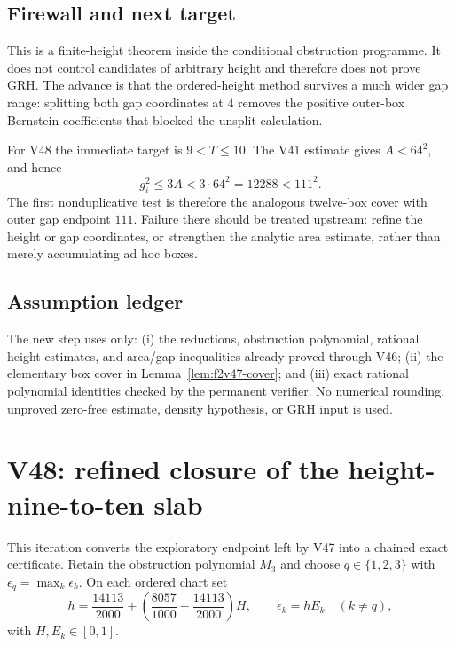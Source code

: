 \documentclass[11pt]{article}
\theoremstyle{definition}
\theoremstyle{remark}
\begin{document}
\subsection*{Firewall and next target}
\label{fire:f2v47}
This is a finite-height theorem inside the conditional obstruction programme.  It
does not control candidates of arbitrary height and therefore does not prove GRH.
The advance is that the ordered-height method survives a much wider gap range:
splitting both gap coordinates at \(4\) removes the positive outer-box Bernstein
coefficients that blocked the unsplit calculation.

For V48 the immediate target is \(9<T\leq10\).  The V41 estimate gives
\(A<64^2\), and hence
\begin{equation}
  g_i^2\leq3A<3\cdot64^2=12288<111^2.
  \label{eq:f2v47-next-gap}
\end{equation}
The first nonduplicative test is therefore the analogous twelve-box cover with
outer gap endpoint \(111\).  Failure there should be treated upstream: refine the
height or gap coordinates, or strengthen the analytic area estimate, rather than
merely accumulating ad hoc boxes.

\subsection*{Assumption ledger}
\label{ass:f2v47}
The new step uses only: (i) the reductions, obstruction polynomial, rational
height estimates, and area/gap inequalities already proved through V46;
(ii) the elementary box cover in Lemma~\ref{lem:f2v47-cover}; and (iii) exact
rational polynomial identities checked by the permanent verifier.  No numerical
rounding, unproved zero-free estimate, density hypothesis, or GRH input is used.


\endgroup


\clearpage
\section{V48: refined closure of the height-nine-to-ten slab}
\label{sec:f2v48-nine-ten}
\begingroup
\setcounter{equation}{0}
\renewcommand{\theequation}{N48.\arabic{equation}}
\renewcommand{\theHequation}{f2v48.\arabic{equation}}

This iteration converts the exploratory endpoint left by V47 into a chained exact
certificate.  Retain the obstruction polynomial \(M_3\) and choose
\(q\in\{1,2,3\}\) with \(\epsilon_q=\max_k\epsilon_k\).  On each ordered chart set
\begin{equation}
 h=\frac{14113}{2000}
   +\left(\frac{8057}{1000}-\frac{14113}{2000}\right)H,
 \qquad \epsilon_k=hE_k\quad(k\ne q),
 \label{eq:f2v48-height}
\end{equation}
with \(H,E_k\in[0,1]\).
\end{document}
